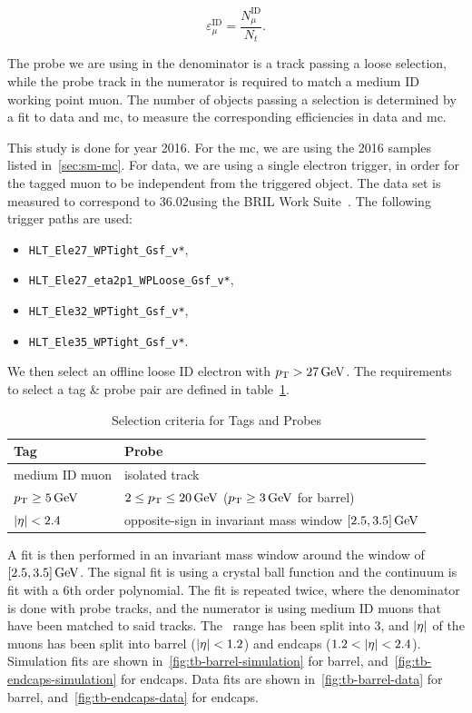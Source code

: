 \begin{equation}
\varepsilon_{\mu}^{\mathrm{ID}} = \frac{N_{\mu}^\mathrm{ID}}{N_{t}}.
\end{equation}

The probe we are using in the denominator is a track passing a loose selection, while the probe track in the numerator is required to match a medium ID working point muon. The number of objects passing a selection is determined by a fit to data and \gls{mc}, to measure the corresponding efficiencies in data and \gls{mc}.

This study is done for year 2016. For the \gls{mc}, we are using the 2016 samples listed in~\ref{sec:sm-mc}. For data, we are  using a single electron trigger, in order for the tagged muon to be independent from the triggered object. The data set is measured to correspond to 36.02\fbinv using the BRIL Work Suite~\cite{bril}. The following trigger paths are used:

\begin{itemize}
\item \texttt{HLT\_Ele27\_WPTight\_Gsf\_v*},
\item \texttt{HLT\_Ele27\_eta2p1\_WPLoose\_Gsf\_v*},
\item \texttt{HLT\_Ele32\_WPTight\_Gsf\_v*},
\item \texttt{HLT\_Ele35\_WPTight\_Gsf\_v*}.
\end{itemize}

We then select an offline loose ID electron with $p_{\mathrm{T}}>27\,\text{Ge\hspace{-.08em}V}$. The requirements to select a tag \& probe pair are defined in table~\ref{tab:tag-probe-def}.

\begin{table}[!htb]
	\centering
	\label{tab:tag-probe-def}
		\caption{Selection criteria for Tags and Probes}
			\begin{tabular}{l|l} \hline
			Tag & Probe \\ \hline
			medium ID muon & isolated track\\
			$p_{\mathrm{T}} \geq 5\,\text{Ge\hspace{-.08em}V}$ & $2\leq p_{\mathrm{T}}\leq 20\,\text{Ge\hspace{-.08em}V}$  ($ p_{\mathrm{T}}\geq 3 \,\text{Ge\hspace{-.08em}V} $ for barrel) \\
			$\lvert \eta \rvert<2.4$ & opposite-sign in invariant mass window $[2.5,3.5]\,\text{Ge\hspace{-.08em}V}$ \\ \hline
			\end{tabular}
\end{table}

A fit is then performed in an invariant mass window around the \JPsi window of $[2.5,3.5]\,\text{Ge\hspace{-.08em}V}$. The signal fit is using a crystal ball function and the continuum is fit with a 6th order polynomial. The fit is repeated twice, where the denominator is done with probe tracks, and the numerator is using medium ID muons that have been matched to said tracks. The \DR~range has been split into 3, and $\lvert \eta \rvert$ of the muons has been split into barrel ($\lvert \eta \rvert<1.2$) and endcaps ($1.2<\lvert \eta \rvert<2.4$). Simulation fits are shown in~\ref{fig:tb-barrel-simulation} for barrel, and~\ref{fig:tb-endcaps-simulation} for endcaps. Data fits are shown in~\ref{fig:tb-barrel-data} for barrel, and~\ref{fig:tb-endcaps-data} for endcaps.

